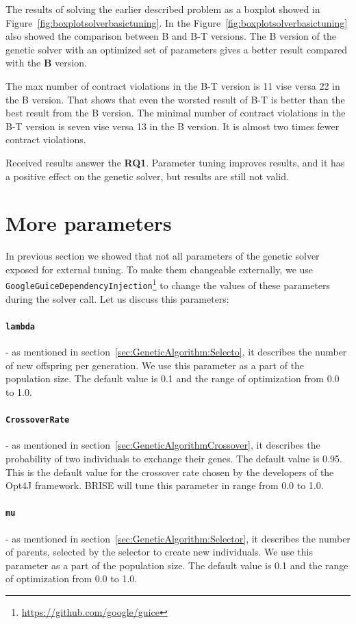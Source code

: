The results of solving the earlier described problem as a boxplot showed in Figure~\ref{fig:boxplotsolverbasictuning}. In the Figure~\ref{fig:boxplotsolverbasictuning} also showed the comparison between B and B-T versions.  The B version of the genetic solver with an optimized set of parameters gives a better result compared with the \textbf{B} version.

The max number of contract violations in the B-T version is 11 vise versa 22 in the B version. That shows that even the worsted result of B-T is better than the best result from the B version. The minimal number of contract violations in the B-T version is seven vise versa 13 in the B version. It is almost two times fewer contract violations. 

Received results answer the \textbf{RQ1}. Parameter tuning improves results, and it has a positive effect on the genetic solver, but results are still not valid. 

\section{More parameters}

In previous section we showed that not all parameters of the genetic solver exposed for external tuning. To make them changeable externally, we use \texttt{GoogleGuiceDependencyInjection}\footnote{\url{https://github.com/google/guice}} to change the values of these parameters during the solver call. Let us discuss this parameters:
	 \paragraph{\texttt{lambda}} - as mentioned in section~\ref{sec:GeneticAlgorithm:Selecto}, it describes the number of new offspring per generation. We use this parameter as a part of the population size.
	 The default value is 0.1 and the range of optimization from 0.0 to 1.0.
	 \paragraph{\texttt{CrossoverRate}} - as mentioned in section~\ref{sec:GeneticAlgorithmCrossover}, it describes the probability of two individuals to exchange their genes. The default value is 0.95. This is the default value for the crossover rate chosen by the developers of the Opt4J framework. BRISE will tune this parameter in range from 0.0 to 1.0.
	 \paragraph{\texttt{mu}} - as mentioned in section~\ref{sec:GeneticAlgorithm:Selector}, it describes the number of parents, selected by the selector to create new individuals. We use this parameter as a part of the population size.
	 The default value is 0.1 and the range of optimization from 0.0 to 1.0.
